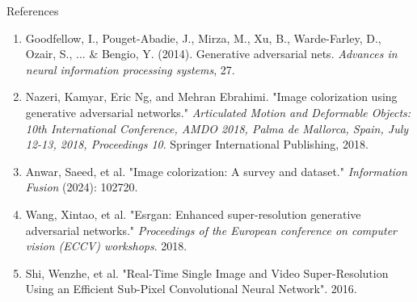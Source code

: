 \documentclass[aspectratio=169]{beamer}
\theoremstyle{definition}
\begin{document}
\begin{frame}{References}
    \begin{enumerate}
        \item Goodfellow, I., Pouget-Abadie, J., Mirza, M., Xu, B., Warde-Farley, D., Ozair, S., ... \& Bengio, Y. (2014). Generative adversarial nets. \emph{Advances in neural information processing systems}, 27.
        \item Nazeri, Kamyar, Eric Ng, and Mehran Ebrahimi. "Image colorization using generative adversarial networks." \emph{Articulated Motion and Deformable Objects: 10th International Conference, AMDO 2018, Palma de Mallorca, Spain, July 12-13, 2018, Proceedings 10}. Springer International Publishing, 2018.
        \item Anwar, Saeed, et al. "Image colorization: A survey and dataset." \emph{Information Fusion} (2024): 102720.
        \item Wang, Xintao, et al. "Esrgan: Enhanced super-resolution generative adversarial networks." \emph{Proceedings of the European conference on computer vision (ECCV) workshops}. 2018.
        \item Shi, Wenzhe, et al. "Real-Time Single Image and Video Super-Resolution Using an Efficient Sub-Pixel Convolutional Neural Network". 2016.
    \end{enumerate}
\end{frame}
\end{document}
